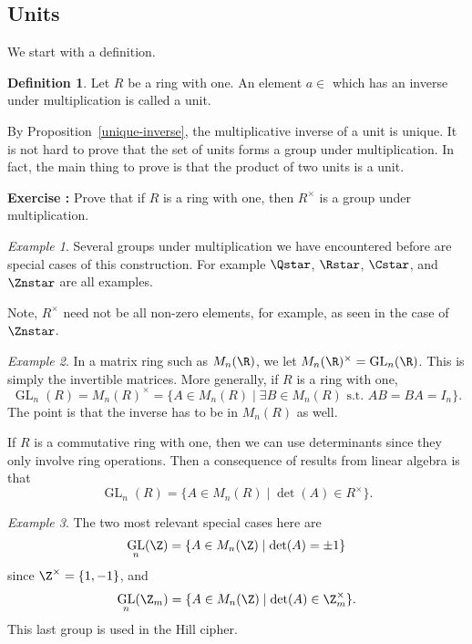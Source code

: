 \documentclass[12pt]{amsart}
\newcommand{\terminology}[1]{\textbf{\textit{#1}}}
\renewcommand{\terminology}[1]{#1}
\newcommand{\term}{\terminology}
\DeclareMathOperator{\GL}{GL}
\newcounter{probs}
\newenvironment{prob}{%
  \refstepcounter{probs}
  \par\medskip\noindent\textbf{Exercise \theprobs:} }{\par\medskip}
\theoremstyle{plain}
\theoremstyle{definition}
\newtheorem{defn}[thm]{Definition}
\theoremstyle{remark}
\newtheorem*{exam}{Example}
\begin{document}
\subsection{Units}
We start with a definition.
\begin{defn}
Let $R$ be a ring with one.  An element $a\in $ which has an inverse under
multiplication is called a \term{unit}.  
\end{defn}
By Proposition~\ref{unique-inverse}, the multiplicative inverse of a unit
is unique.  It is not hard to prove that the set of units forms a
group under multiplication.  In fact, the main thing to prove is that
the product of two units is a unit.
\begin{prob}
  Prove that if $R$ is a ring with one, then $R^\times$ is a group
  under multiplication.
\end{prob}
\begin{exam}
  Several groups under multiplication we have encountered before are
  special cases of this construction.  For example $\Qstar$, $\Rstar$,
  $\Cstar$, and $\Znstar$ are all examples.  
\end{exam}
Note, $R^\times$ need not be all non-zero elements, for example, as
seen in the case of $\Znstar$.
\begin{exam}
  In a matrix ring such as $M_n(\R)$, we let $M_n(\R)^\times =
  \GL_n(\R)$.  This is simply the invertible matrices.  More
  generally, if $R$ is a ring with one,
  \[ \GL_n(R)= M_n(R)^\times = \{A\in M_n(R) \mid \exists B\in M_n(R)
  \text{ s.t. } AB=BA=I_n\}.\]
  The point is that the inverse has to be in $M_n(R)$ as well.
\end{exam}

If $R$ is a commutative ring with one, then we can use determinants
since they only involve ring operations.  Then a consequence of
results from linear algebra is that
\[ \GL_n(R) = \{A\in M_n(R)\mid \det(A)\in R^\times\}.\]
\begin{exam}
  The two most relevant special cases here are
  \[ \GL_n(\Z) = \{A\in M_n(\Z)\mid \det(A)=\pm 1\}\]
  since $\Z^\times = \{1,-1\}$, and
  \[ \GL_n(\Z_m) = \{A\in M_n(\Z)\mid \det(A)\in \Z_m^\times\}.\]
  This last group is used in the Hill cipher.
\end{exam}
\end{document}
